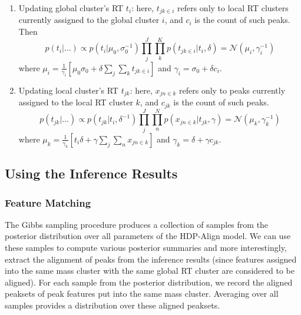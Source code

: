 \begin{enumerate}
\item Updating global cluster's RT $t_{i}$: here, $t_{jk\in i}$ refers only to local RT clusters currently assigned to the global cluster $i$, and $c_{i}$ is the count of such peaks. Then
\begin{dmath}
p(t_{i}|\ldots)\propto p(t_{i}|\mu_{0},\sigma_{0}^{-1})\prod_{j}^{J}\prod_{k}^{K}p(t_{jk\in i}|t_{i},\delta)=\mathcal{N}(\mu_{i},\gamma_{i}^{-1})
\end{dmath}
where $\mu_{i}=\frac{1}{\gamma_{i}}\left[\mu_{0}\sigma_{0}+\delta\sum_{j}\sum_{k}t_{jk\in i}\right]$ and $\gamma_{i}=\sigma_{0}+\delta c_{i}$. 
\item Updating local cluster's RT $t_{jk}$: here, $x_{jn\in k}$ refers only to peaks currently assigned to the local RT cluster $k$, and
$c_{jk}$ is the count of such peaks.
\begin{dmath}
p(t_{jk}|\ldots)\propto p(t_{jk}|t_{i},\delta^{-1})\prod_{j}^{J}\prod_{n}^{N}p(x_{jn\in k}|t_{jk},\gamma)=\mathcal{N}(\mu_{k},\gamma_{k}^{-1})
\end{dmath}
where $\mu_{k}=\frac{1}{\gamma_{k}}\left[t_{i}\delta+\gamma\sum_{j}\sum_{n}x_{jn\in k}\right]$ and $\gamma_{k}=\delta+\gamma c_{jk}$. 
\end{enumerate}

\subsection{Using the Inference Results}

\subsubsection{Feature Matching}
\label{subsub:feature-matching}

The Gibbs sampling procedure produces a collection of samples from the posterior distribution over all parameters of the HDP-Align model. We can use these samples to compute various posterior summaries and more interestingly, extract the alignment of peaks from the inference results (since features assigned into the same mass cluster with the same global RT cluster are considered to be aligned). For each sample from the posterior distribution, we record the aligned peaksets of peak features put into the same mass cluster. Averaging over all samples provides a distribution over these aligned peaksets. 

